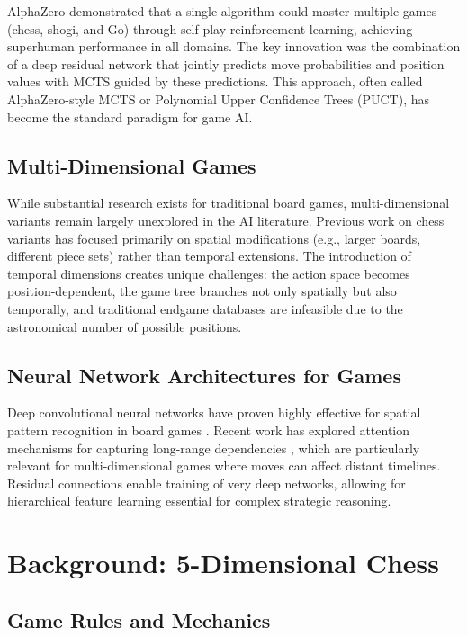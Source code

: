 \documentclass{article}
\begin{document}
AlphaZero \cite{silver2017mastering} demonstrated that a single algorithm could master multiple games (chess, shogi, and Go) through self-play reinforcement learning, achieving superhuman performance in all domains. The key innovation was the combination of a deep residual network that jointly predicts move probabilities and position values with MCTS guided by these predictions. This approach, often called AlphaZero-style MCTS or Polynomial Upper Confidence Trees (PUCT), has become the standard paradigm for game AI.

\subsection{Multi-Dimensional Games}

While substantial research exists for traditional board games, multi-dimensional variants remain largely unexplored in the AI literature. Previous work on chess variants has focused primarily on spatial modifications (e.g., larger boards, different piece sets) rather than temporal extensions. The introduction of temporal dimensions creates unique challenges: the action space becomes position-dependent, the game tree branches not only spatially but also temporally, and traditional endgame databases are infeasible due to the astronomical number of possible positions.

\subsection{Neural Network Architectures for Games}

Deep convolutional neural networks have proven highly effective for spatial pattern recognition in board games \cite{silver2016mastering}. Recent work has explored attention mechanisms for capturing long-range dependencies \cite{vaswani2017attention}, which are particularly relevant for multi-dimensional games where moves can affect distant timelines. Residual connections \cite{he2016deep} enable training of very deep networks, allowing for hierarchical feature learning essential for complex strategic reasoning.

\section{Background: 5-Dimensional Chess}

\subsection{Game Rules and Mechanics}
\end{document}
